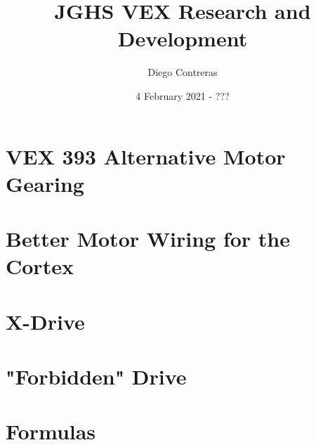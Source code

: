 \documentclass[12pt]{article}
\title{JGHS VEX Research and Development}
\author{Diego Contreras}
\date{4 February 2021 - ???}
\begin{document}
\maketitle
\newpage
\tableofcontents

















\section{VEX 393 Alternative Motor Gearing}
\section{Better Motor Wiring for the Cortex}
\section{X-Drive}
\section{"Forbidden" Drive}
\section{Formulas}



\end{document}
